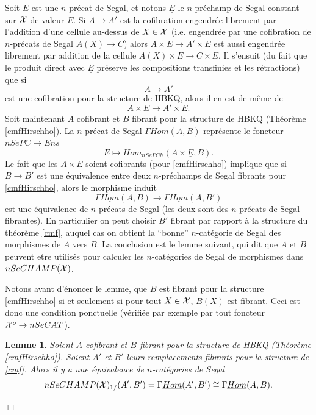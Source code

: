 \documentclass[12pt]{article}
\newcommand{\eop}{\hfill $\Box$\vspace{.1in}}
\newtheorem{lemme}[lemma]{Lemme}
\newcommand{\Xx}{{\cal X}}
\begin{document}
Soit $E$ est une $n$-pr\'ecat de Segal, et notons
$\underline{E}$ le $n$-pr\'echamp de Segal constant sur $\Xx$ de valeur $E$.
Si $A\rightarrow A'$ est la cofibration engendr\'ee librement par l'addition
d'une cellule au-dessus de $X\in \Xx$ (i.e. engendr\'ee par une cofibration de
$n$-pr\'ecats de Segal $A(X)\rightarrow C$) alors $A\times
\underline{E}\rightarrow A'\times \underline{E}$ est aussi engendr\'ee
librement par addition de la cellule $A(X)\times E \rightarrow C\times E$.
Il s'ensuit (du fait que le produit direct avec $\underline{E}$ pr\'eserve
les compositions transfinies et les r\'etractions) que si
$$
A\rightarrow A'
$$
est une cofibration pour la structure de HBKQ, alors
il en est de m\^eme de
$$
A\times
\underline{E}\rightarrow A'\times \underline{E}.
$$
Soit maintenant $A$ cofibrant et $B$ fibrant pour la structure de
HBKQ (Th\'eor\`eme \ref{cmfHirschho}). La $n$-pr\'ecat de
Segal
$\Gamma \underline{Hom}(A,B)$ repr\'esente le foncteur $nSePC\rightarrow Ens$
$$
E\mapsto Hom _{nSePCh}(A\times \underline{E}, B).
$$
Le fait que les $A\times \underline{E}$ soient cofibrants (pour
\ref{cmfHirschho})
implique que si $B\rightarrow B'$ est une \'equivalence entre deux
$n$-pr\'echamps de Segal fibrants pour \ref{cmfHirschho}, alors le morphisme
induit
$$
\Gamma \underline{Hom}(A,B)\rightarrow \Gamma \underline{Hom}(A,B')
$$
est une \'equivalence de $n$-pr\'ecats de Segal (les deux sont des
$n$-pr\'ecats de Segal fibrantes). En particulier
on peut choisir $B'$
fibrant par rapport \`a la structure du th\'eor\`eme \ref{cmf},
auquel cas on obtient la
``bonne'' $n$-cat\'egorie de Segal des morphismes de $A$ vers $B$. La conclusion
est le lemme suivant, qui dit que $A$ et $B$ peuvent etre utilis\'es pour
calculer les $n$-cat\'egories de Segal de morphismes dans $nSeCHAMP (\Xx )$.

Notons avant d'\'enoncer le lemme, que $B$ est fibrant pour la structure
\ref{cmfHirschho} si et seulement si pour tout $X\in \Xx$, $B(X)$ est fibrant.
Ceci est donc une condition ponctuelle (v\'erifi\'ee par exemple par tout
foncteur $\Xx ^o \rightarrow nSeCAT$).

\begin{lemme}
\label{bonhomHirschho}
Soient $A$ cofibrant et $B$ fibrant pour la structure de
HBKQ (Th\'eor\`eme \ref{cmfHirschho}). Soient $A'$ et $B'$
leurs remplacements fibrants pour la structure de \ref{cmf}. Alors
il y a une \'equivalence de $n$-cat\'egories de Segal
$$
nSeCHAMP(\Xx )_{1/}(A',B')=\Gamma \underline{Hom}(A',B')\cong
\Gamma \underline{Hom}(A,B).
$$
\end{lemme}
\eop
\end{document}

